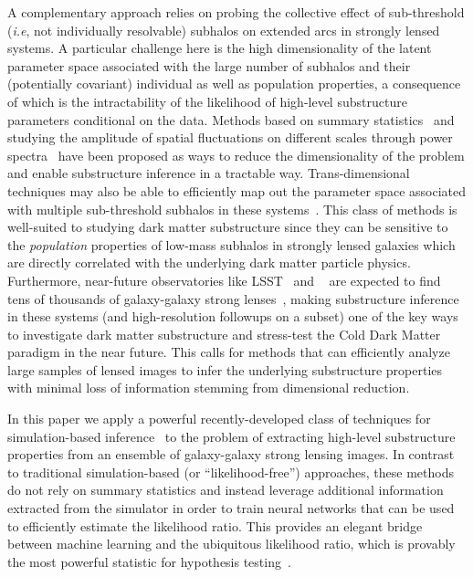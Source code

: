 \documentclass[twocolumn]{aastex62}
\begin{document}
A complementary approach relies on probing the collective effect of sub-threshold (\emph{i.e}, not individually resolvable) subhalos on extended arcs in strongly lensed systems. A particular challenge here is the high dimensionality of the latent parameter space associated with the large number of subhalos and their (potentially covariant) individual as well as population properties, a consequence of which is the intractability of the likelihood of high-level substructure parameters conditional on the data. Methods based on summary statistics~\citep{1702.00009} and studying the amplitude of spatial fluctuations on different scales through power spectra~\citep{1403.2720,1809.00004,1707.04590,1806.07897,1808.03501,1710.03075,1506.01724} have been proposed as ways to reduce the dimensionality of the problem and enable substructure inference in a tractable way. Trans-dimensional techniques may also be able to efficiently map out the parameter space associated with multiple sub-threshold subhalos in these systems~\citep{1508.00662,1706.06111}. This class of methods is well-suited to studying dark matter substructure since they can be sensitive to the \emph{population} properties of low-mass subhalos in strongly lensed galaxies which are directly correlated with the underlying dark matter particle physics. Furthermore, near-future observatories like LSST~\citep{0912.0201,2019arXiv190201055D,1902.05141} and \Euclid~\citep{1001.0061} are expected to find tens of thousands of galaxy-galaxy strong lenses~\citep{2015ApJ...811...20C}, making substructure inference in these systems (and high-resolution followups on a subset) one of the key ways to investigate dark matter substructure and stress-test the Cold Dark Matter paradigm in the near future. This calls for methods that can efficiently analyze large samples of lensed images to infer the underlying substructure properties with minimal loss of information stemming from dimensional reduction.

In this paper we apply a powerful recently-developed class of techniques for simulation-based inference~\citep{1805.00013,1805.00020,1805.12244} to the problem of extracting high-level substructure properties from an ensemble of galaxy-galaxy strong lensing images. In contrast to traditional simulation-based (or ``likelihood-free'') approaches, these methods do not rely on summary statistics and instead leverage additional information extracted from the simulator in order to train neural networks that can be used to efficiently estimate the likelihood ratio. This provides an elegant bridge between machine learning and the ubiquitous likelihood ratio, which is provably the most powerful statistic for hypothesis testing~\citep{1933RSPTA.231..289N}.
\end{document}
